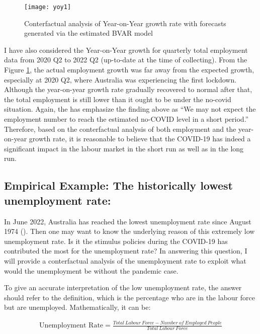 \documentclass{monashthesis}
\begin{document}
\begin{figure}[H]
\texttt{[image: yoy1]}
\centering
\caption{Conterfactual analysis of Year-on-Year growth rate with forecasts generated via the estimated BVAR model}
\label{fig:yoy}
\end{figure}

I have also considered the Year-on-Year growth for quarterly total employment data from 2020 Q2 to 2022 Q2 (up-to-date at the time of collecting). From the Figure \ref{fig:yoy}, the actual employment growth was far away from the expected growth, especially at 2020 Q2, where Australia was experiencing the first lockdown. Although the year-on-year growth rate gradually recovered to normal after that, the total employment is still lower than it ought to be under the no-covid situation. Again, the has emphasize the finding above as ``We may not expect the employment number to reach the estimated no-COVID level in a short period.'' Therefore, based on the conterfactual analysis of both employment and the year-on-year growth rate, it is reasonable to believe that the COVID-19 has indeed a significant impact in the labour market in the short run as well as in the long run.

\hypertarget{empirical-example-the-historically-lowest-unemployment-rate}{%
\subsection{Empirical Example: The historically lowest unemployment rate:}\label{empirical-example-the-historically-lowest-unemployment-rate}}

In June 2022, Australia has reached the lowest unemployment rate since August 1974 (\textcite{ABS2022a}). Then one may want to know the underlying reason of this extremely low unemployment rate. Is it the stimulus policies during the COVID-19 has contributed the most for the unemployment rate? In answering this question, I will provide a conterfactual analysis of the unemployment rate to exploit what would the unemployment be without the pandemic case.

To give an accurate interpretation of the low unemployment rate, the answer should refer to the definition, which is the percentage who are in the labour force but are unemployed. Mathematically, it can be:

\[
\begin{aligned}
\text{Unemployment Rate}=\frac{Total\ Labour\  Force- Number\ of \ Employed \ People}{Total\ Labour \ Force}
\label{equ:unemp}
\end{aligned}
\]
\end{document}
